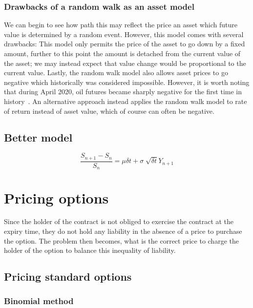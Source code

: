 \subsubsection{Drawbacks of a random walk as an asset model}

We can begin to see how path this may reflect the price an asset which future value is determined by a random event. However, this model comes with several drawbacks: This model only permits the price of the asset to go down by a fixed amount, further to this point the amount is detached from the current value of the asset; we may instead expect that value change would be proportional to the current value. Lastly, the random walk model also allows asset prices to go negative which historically was considered impossible. However, it is worth noting that during April 2020, oil futures became sharply negative for the first time in history~\cite{NegativeOil}. An alternative approach instead applies the random walk model to rate of return instead of asset value, which of course can often be negative.

\subsection{Better model}

\begin{equation}
    \frac{S_{n+1} - S_n}{S_n} = \mu\delta t + \sigma\sqrt[]{\delta t}Y_{n+1}
\end{equation}

\section{Pricing options}

Since the holder of the contract is not obliged to exercise the contract at the expiry time, they do not hold any liability in the absence of a price to purchase the option. The problem then becomes, what is the correct price to charge the holder of the option to balance this inequality of liability.



\subsection{Pricing standard options}

\subsubsection{Binomial method}

